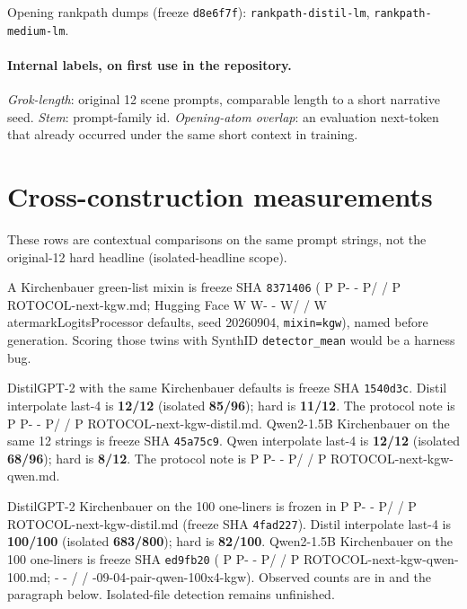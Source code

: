 \documentclass[11pt,a4paper]{article}
\makeatletter
\newcommand{\ttfile}[1]{\bgroup\ttfamily\ttfile@scan#1\relax\egroup}
\def\ttfile@scan#1{%
  \ifx#1\relax
  \else
    \ifx#1-%
      -\penalty0 %
    \else
      \ifx#1/%
        /\penalty0 %
      \else
        #1%
      \fi
    \fi
    \expandafter\ttfile@scan
  \fi}
\theoremstyle{definition}
\makeatother
\begin{document}
Opening rankpath dumps (freeze \texttt{d8e6f7f}):
\texttt{rankpath-distil-lm}, \texttt{rankpath-medium-lm}.

\paragraph{Internal labels, on first use in the repository.}
\emph{Grok-length}: original 12 scene prompts, comparable length to a
short narrative seed. \emph{Stem}: prompt-family id.
\emph{Opening-atom overlap}: an evaluation next-token that already
occurred under the same short context in training.


\section{Cross-construction measurements}
\label{app:xcon}

These rows are contextual comparisons on the same prompt strings, not
the original-12 hard headline (isolated-headline scope).

A Kirchenbauer green-list mixin is freeze SHA \texttt{8371406}
(\ttfile{PROTOCOL-next-kgw.md}; Hugging Face
\ttfile{WatermarkLogitsProcessor} defaults, seed 20260904,
\texttt{mixin=kgw}), named before generation. Scoring those twins
with SynthID \texttt{detector\_mean} would be a harness bug.

DistilGPT-2 with the same Kirchenbauer defaults is freeze SHA
\texttt{1540d3c}. Distil interpolate last-4 is \textbf{12/12}
(isolated \textbf{85/96}); hard is \textbf{11/12}. The protocol note is
\ttfile{PROTOCOL-next-kgw-distil.md}. Qwen2-1.5B Kirchenbauer on the
same 12 strings is freeze SHA \texttt{45a75c9}. Qwen interpolate last-4
is \textbf{12/12} (isolated \textbf{68/96}); hard is \textbf{8/12}.
The protocol note is \ttfile{PROTOCOL-next-kgw-qwen.md}.

DistilGPT-2 Kirchenbauer on the 100 one-liners is frozen in
\ttfile{PROTOCOL-next-kgw-distil.md} (freeze SHA
\texttt{4fad227}). Distil interpolate last-4 is \textbf{100/100}
(isolated \textbf{683/800}); hard is \textbf{82/100}. Qwen2-1.5B Kirchenbauer on the 100 one-liners is freeze SHA
\texttt{ed9fb20}
(\ttfile{PROTOCOL-next-kgw-qwen-100.md};
\ttfile{2026-09-04-pair-qwen-100x4-kgw}).
Observed counts are in  and the paragraph below.
Isolated-file detection remains unfinished.
\end{document}
